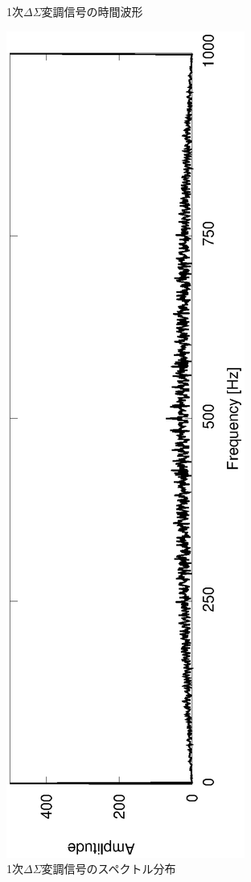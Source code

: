 \documentclass[a4j]{jsarticle}
\begin{document}
\begin{figure}[H]
 \vspace{-2cm}
 \caption{1次$\Delta\Sigma$変調信号の時間波形}
 \label{1stt}
\end{figure}

\begin{figure}[H]
 \centering
 \vspace{-4cm}
 \hspace{-2cm}
 \includegraphics[angle=-90,scale=0.6]{1stout_spec.eps}
  \vspace{-2cm}
 \caption{1次$\Delta\Sigma$変調信号のスペクトル分布}
 \label{1sts}
\end{figure}
\end{document}
